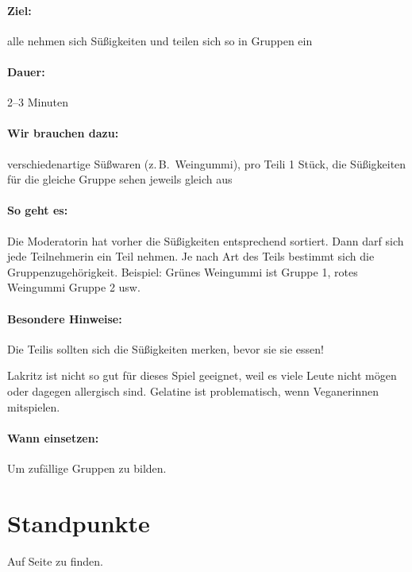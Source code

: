 \paragraph{Ziel:} alle nehmen sich Süßigkeiten und teilen sich so in Gruppen ein
\paragraph{Dauer:} 2--3 Minuten
\paragraph{Wir brauchen dazu:} verschiedenartige Süßwaren (z.\,B.~Weingummi), pro Teili 1 Stück, die Süßigkeiten für die gleiche Gruppe sehen jeweils gleich aus
\paragraph{So geht es:} Die Moderatorin hat vorher die Süßigkeiten entsprechend sortiert. Dann darf sich jede Teilnehmerin ein Teil nehmen. Je nach Art des Teils bestimmt sich die Gruppenzugehörigkeit. Beispiel: Grünes Weingummi ist Gruppe 1, rotes Weingummi Gruppe 2 usw.
\paragraph{Besondere Hinweise:} Die Teilis sollten sich die Süßigkeiten merken, bevor sie sie essen!

Lakritz ist nicht so gut für dieses Spiel geeignet, weil es viele Leute nicht mögen oder dagegen allergisch sind. Gelatine ist problematisch, wenn Veganerinnen mitspielen.
\paragraph{Wann einsetzen:} Um zufällige Gruppen zu bilden.

\section{Standpunkte}
Auf Seite \pageref{standpunkte} zu finden.


